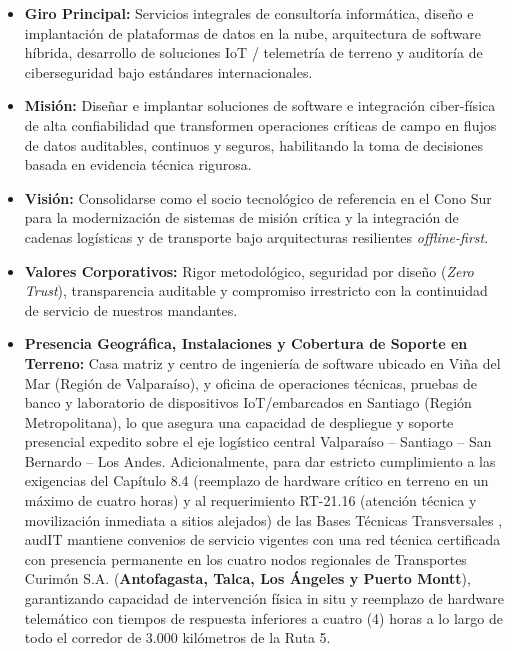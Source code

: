 \begin{itemize}
    \item \textbf{Giro Principal:} Servicios integrales de consultoría informática, diseño e implantación de plataformas de datos en la nube, arquitectura de software híbrida, desarrollo de soluciones IoT / telemetría de terreno y auditoría de ciberseguridad bajo estándares internacionales.
    \item \textbf{Misión:} Diseñar e implantar soluciones de software e integración ciber-física de alta confiabilidad que transformen operaciones críticas de campo en flujos de datos auditables, continuos y seguros, habilitando la toma de decisiones basada en evidencia técnica rigurosa.
    \item \textbf{Visión:} Consolidarse como el socio tecnológico de referencia en el Cono Sur para la modernización de sistemas de misión crítica y la integración de cadenas logísticas y de transporte bajo arquitecturas resilientes \emph{offline-first}.
    \item \textbf{Valores Corporativos:} Rigor metodológico, seguridad por diseño (\emph{Zero Trust}), transparencia auditable y compromiso irrestricto con la continuidad de servicio de nuestros mandantes.
    \item \textbf{Presencia Geográfica, Instalaciones y Cobertura de Soporte en Terreno:} Casa matriz y centro de ingeniería de software ubicado en Viña del Mar (Región de Valparaíso), y oficina de operaciones técnicas, pruebas de banco y laboratorio de dispositivos IoT/embarcados en Santiago (Región Metropolitana), lo que asegura una capacidad de despliegue y soporte presencial expedito sobre el eje logístico central Valparaíso -- Santiago -- San Bernardo -- Los Andes. Adicionalmente, para dar estricto cumplimiento a las exigencias del Capítulo 8.4 (reemplazo de hardware crítico en terreno en un máximo de cuatro horas) y al requerimiento RT-21.16 (atención técnica y movilización inmediata a sitios alejados) de las Bases Técnicas Transversales \parencite{bases_transversales_2026}, audIT mantiene convenios de servicio vigentes con una red técnica certificada con presencia permanente en los cuatro nodos regionales de Transportes Curimón S.A. (\textbf{Antofagasta, Talca, Los Ángeles y Puerto Montt}), garantizando capacidad de intervención física in situ y reemplazo de hardware telemático con tiempos de respuesta inferiores a cuatro (4) horas a lo largo de todo el corredor de 3.000 kilómetros de la Ruta 5.
\end{itemize}

